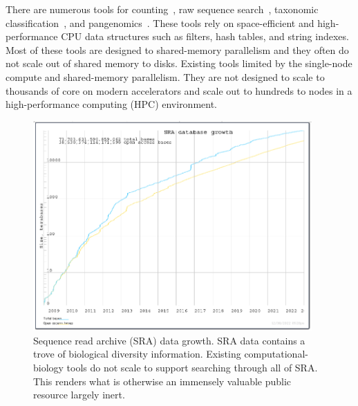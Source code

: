 There are numerous tools for \kmer counting~\cite{MarccaisKi11,PandeyBJP17a}, raw sequence search~\cite{solomon2016fast,PandeyABFJP18Cell}, taxonomic classification~\cite{wood2014kraken,wood2019improved}, and pangenomics~\cite{garrison2018variation,pandey2021variantstore}. These tools rely on space-efficient and high-performance CPU data structures such as filters, hash tables, and string indexes. Most of these tools are designed to shared-memory parallelism and they often do not scale out of shared memory to disks.
Existing tools limited by the single-node compute and shared-memory parallelism. They are not designed to scale to thousands of core on modern accelerators and scale out to hundreds to nodes in a high-performance computing (HPC) environment.


\begin{figure}
\centering
\includegraphics[width=0.95\textwidth]{images/SRA_data_growth.png}
\caption{Sequence read archive (SRA) data growth. SRA data contains a trove of biological diversity information. Existing computational-biology tools do not scale to support searching through all of SRA. This renders what is otherwise an immensely valuable public resource largely inert.}

\label{fig:sra_data}
\end{figure}

